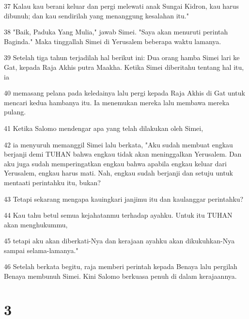 \par 37 Kalau kau berani keluar dan pergi melewati anak Sungai Kidron, kau harus dibunuh; dan kau sendirilah yang menanggung kesalahan itu."
\par 38 "Baik, Paduka Yang Mulia," jawab Simei. "Saya akan menuruti perintah Baginda." Maka tinggallah Simei di Yerusalem beberapa waktu lamanya.
\par 39 Setelah tiga tahun terjadilah hal berikut ini: Dua orang hamba Simei lari ke Gat, kepada Raja Akhis putra Maakha. Ketika Simei diberitahu tentang hal itu, ia
\par 40 memasang pelana pada keledainya lalu pergi kepada Raja Akhis di Gat untuk mencari kedua hambanya itu. Ia menemukan mereka lalu membawa mereka pulang.
\par 41 Ketika Salomo mendengar apa yang telah dilakukan oleh Simei,
\par 42 ia menyuruh memanggil Simei lalu berkata, "Aku sudah membuat engkau berjanji demi TUHAN bahwa engkau tidak akan meninggalkan Yerusalem. Dan aku juga sudah memperingatkan engkau bahwa apabila engkau keluar dari Yerusalem, engkau harus mati. Nah, engkau sudah berjanji dan setuju untuk mentaati perintahku itu, bukan?
\par 43 Tetapi sekarang mengapa kauingkari janjimu itu dan kaulanggar perintahku?
\par 44 Kau tahu betul semua kejahatanmu terhadap ayahku. Untuk itu TUHAN akan menghukummu,
\par 45 tetapi aku akan diberkati-Nya dan kerajaan ayahku akan dikukuhkan-Nya sampai selama-lamanya."
\par 46 Setelah berkata begitu, raja memberi perintah kepada Benaya lalu pergilah Benaya membunuh Simei. Kini Salomo berkuasa penuh di dalam kerajaannya.

\chapter{3}

